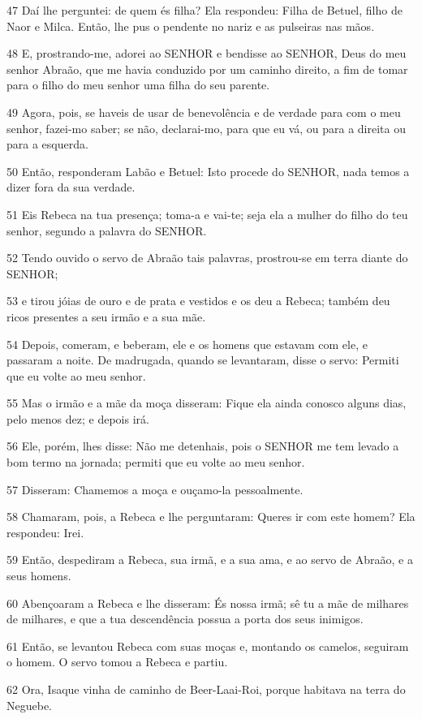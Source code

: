 \par 47 Daí lhe perguntei: de quem és filha? Ela respondeu: Filha de Betuel, filho de Naor e Milca. Então, lhe pus o pendente no nariz e as pulseiras nas mãos.
\par 48 E, prostrando-me, adorei ao SENHOR e bendisse ao SENHOR, Deus do meu senhor Abraão, que me havia conduzido por um caminho direito, a fim de tomar para o filho do meu senhor uma filha do seu parente.
\par 49 Agora, pois, se haveis de usar de benevolência e de verdade para com o meu senhor, fazei-mo saber; se não, declarai-mo, para que eu vá, ou para a direita ou para a esquerda.
\par 50 Então, responderam Labão e Betuel: Isto procede do SENHOR, nada temos a dizer fora da sua verdade.
\par 51 Eis Rebeca na tua presença; toma-a e vai-te; seja ela a mulher do filho do teu senhor, segundo a palavra do SENHOR.
\par 52 Tendo ouvido o servo de Abraão tais palavras, prostrou-se em terra diante do SENHOR;
\par 53 e tirou jóias de ouro e de prata e vestidos e os deu a Rebeca; também deu ricos presentes a seu irmão e a sua mãe.
\par 54 Depois, comeram, e beberam, ele e os homens que estavam com ele, e passaram a noite. De madrugada, quando se levantaram, disse o servo: Permiti que eu volte ao meu senhor.
\par 55 Mas o irmão e a mãe da moça disseram: Fique ela ainda conosco alguns dias, pelo menos dez; e depois irá.
\par 56 Ele, porém, lhes disse: Não me detenhais, pois o SENHOR me tem levado a bom termo na jornada; permiti que eu volte ao meu senhor.
\par 57 Disseram: Chamemos a moça e ouçamo-la pessoalmente.
\par 58 Chamaram, pois, a Rebeca e lhe perguntaram: Queres ir com este homem? Ela respondeu: Irei.
\par 59 Então, despediram a Rebeca, sua irmã, e a sua ama, e ao servo de Abraão, e a seus homens.
\par 60 Abençoaram a Rebeca e lhe disseram: És nossa irmã; sê tu a mãe de milhares de milhares, e que a tua descendência possua a porta dos seus inimigos.
\par 61 Então, se levantou Rebeca com suas moças e, montando os camelos, seguiram o homem. O servo tomou a Rebeca e partiu.
\par 62 Ora, Isaque vinha de caminho de Beer-Laai-Roi, porque habitava na terra do Neguebe.
